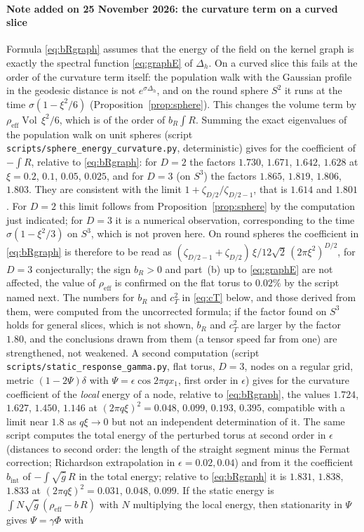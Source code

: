 \documentclass[11pt,a4paper]{article}
\theoremstyle{stmt}
\theoremstyle{defn}
\theoremstyle{rmk}
\numberwithin{equation}{section}
\DeclareMathOperator{\Vol}{Vol}
\begin{document}
\paragraph{Note added on 25 November 2026: the curvature term on a curved slice} Formula \eqref{eq:bRgraph} assumes that the energy of the field on the kernel graph is exactly the spectral function \eqref{eq:graphE} of $\Delta_h$. On a curved slice this fails at the order of the curvature term itself: the population walk with the Gaussian profile in the geodesic distance is not $e^{\sigma\Delta_h}$, and on the round sphere $S^2$ it runs at the time $\sigma(1-\xi^2/6)$ (Proposition~\ref{prop:sphere}). This changes the volume term by $\rho_{\mathrm{eff}}\Vol\,\xi^2/6$, which is of the order of $b_R\int R$. Summing the exact eigenvalues of the population walk on unit spheres (script \texttt{scripts/sphere\_energy\_curvature.py}, deterministic) gives for the coefficient of $-\int R$, relative to \eqref{eq:bRgraph}: for $D=2$ the factors $1.730$, $1.671$, $1.642$, $1.628$ at $\xi=0.2$, $0.1$, $0.05$, $0.025$, and for $D=3$ (on $S^3$) the factors $1.865$, $1.819$, $1.806$, $1.803$. They are consistent with the limit $1+\zeta_{D/2}/\zeta_{D/2-1}$, that is $1.614$ and $1.801$. For $D=2$ this limit follows from Proposition~\ref{prop:sphere} by the computation just indicated; for $D=3$ it is a numerical observation, corresponding to the time $\sigma(1-\xi^2/3)$ on $S^3$, which is not proven here. On round spheres the coefficient in \eqref{eq:bRgraph} is therefore to be read as $(\zeta_{D/2-1}+\zeta_{D/2})\,\xi/12\sqrt2\,(2\pi\xi^2)^{D/2}$, for $D=3$ conjecturally; the sign $b_R>0$ and part~(b) up to \eqref{eq:graphE} are not affected, the value of $\rho_{\mathrm{eff}}$ is confirmed on the flat torus to $0.02\%$ by the script named next. The numbers for $b_R$ and $c_T^2$ in \eqref{eq:cT} below, and those derived from them, were computed from the uncorrected formula; if the factor found on $S^3$ holds for general slices, which is not shown, $b_R$ and $c_T^2$ are larger by the factor $1.80$, and the conclusions drawn from them (a tensor speed far from one) are strengthened, not weakened. A second computation (script \texttt{scripts/static\_response\_gamma.py}, flat torus, $D=3$, nodes on a regular grid, metric $(1-2\Psi)\delta$ with $\Psi=\epsilon\cos2\pi qx_1$, first order in $\epsilon$) gives for the curvature coefficient of the \emph{local} energy of a node, relative to \eqref{eq:bRgraph}, the values $1.724$, $1.627$, $1.450$, $1.146$ at $(2\pi q\xi)^2=0.048$, $0.099$, $0.193$, $0.395$, compatible with a limit near $1.8$ as $q\xi\to0$ but not an independent determination of it. The same script computes the total energy of the perturbed torus at second order in $\epsilon$ (distances to second order: the length of the straight segment minus the Fermat correction; Richardson extrapolation in $\epsilon=0.02,0.04$) and from it the coefficient $b_{\mathrm{int}}$ of $-\int\!\sqrt{\hat g}\,R$ in the total energy; relative to \eqref{eq:bRgraph} it is $1.831$, $1.838$, $1.833$ at $(2\pi q\xi)^2=0.031$, $0.048$, $0.099$. If the static energy is $\int N\sqrt{\hat g}\,(\rho_{\mathrm{eff}}-b\,R)$ with $N$ multiplying the local energy, then stationarity in $\Psi$ gives $\Psi=\gamma\Phi$ with 
\end{document}
